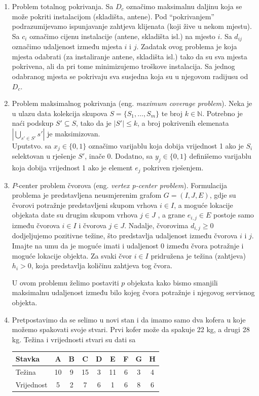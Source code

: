 \documentclass[a4paper, utf8, 11pt, colorlinks]{book}
\begin{document}
\begin{enumerate}
	
	\item Problem totalnog pokrivanja. %
	Sa $D_c$ označimo maksimalnu daljinu koja se može pokriti instalacijom (skladišta, antene). Pod ``pokrivanjem'' podrazumijevamo ispunjavanje zahtjeva klijenata (koji žive u nekom mjestu). Sa $c_i$ označimo cijenu instalacije (antene, skladišta isl.) na mjesto $i$. Sa $d_{ij}$ označimo udaljenost između mjesta $i$ i $j$. Zadatak ovog problema je koja mjesta odabrati (za instaliranje antene, skladišta isl.) tako da su sva mjesta pokrivena, ali da pri tome minimizujemo troškove instalacija. Sa jednog odabranog mjesta se pokrivaju sva susjedna koja su u njegovom radijusu od $D_c$. 
	\item Problem maksimalnog pokrivanja (eng. \emph{maximum coverage problem}). Neka je u ulazu data kolekcija skupova  $S=\{ S_1, \ldots, S_m\}$ te broj $k \in \mathbb{N}$. Potrebno je naći podskup $S' \subseteq S$, tako da je $|S'|\leq k$, a broj pokrivenih elemenata $|\bigcup_{s' \in S'} s'|$ je maksimizovan. \\
	Uputstvo. sa $x_j \in \{0, 1\}$ označimo varijablu koja dobija vrijednost 1 ako je $S_i$ selektovan u rješenje $S'$, inače 0. Dodatno, sa $y_j \in \{0, 1 \}$ definišemo varijablu koja dobija vrijednost 1 ako je   element $e_j$ pokriven rješenjem.  
	\item $P$-center problem čvorova (eng. \emph{vertex p-center problem}). Formulacija problema je  predstavljena neusmjerenim grafom $G = (I, J, E)$, gdje su čvorovi potražnje predstavljeni skupom vrhova $i\in I$, a moguće lokacije objekata date su drugim skupom vrhova $j \in J$ , a grane $e_{i,j} \in E$ postoje samo između čvorova $i \in  I$ i čvorova $j \in J$. Nadalje, čvorovima $d_{i,j}\geq 0$ dodjeljujemo pozitivne težine, što predstavlja udaljenost između čvorova $i$ i $j$. Imajte na umu da je moguće imati i udaljenost 0 između čvora potražnje i moguće lokacije objekta. Za svaki čvor $i \in I$ pridružena je težina (zahtjeva) $h_i>0$, koja predstavlja količinu zahtjeva tog čvora. 
	
	U ovom problemu želimo postaviti $p$ objekata kako bismo smanjili maksimalnu udaljenost između bilo kojeg čvora potražnje i	njegovog servisnog objekta. 
	\item %
	 Pretpostavimo da se selimo u novi stan i da imamo samo dva kofera u koje možemo spakovati svoje stvari. Prvi kofer može da spakuje 22 kg, a drugi 28 kg. Težina i vrijednosti stvari
	su dati sa \\
 \begin{table}[!ht]
 	\centering
	\begin{tabular}{l|cccccccc}
		Stavka & A & B & C & D & E & F & G & H \\ \hline
		Težina & 10 & 9 & 15 & 3 & 11 & 6 & 3 & 4 \\
		Vrijednost & 5 & 2 & 7 & 6 & 1 & 6 & 8 & 6 \\ \hline
	\end{tabular} 
    

\end{table}
\end{enumerate}
\end{document}
